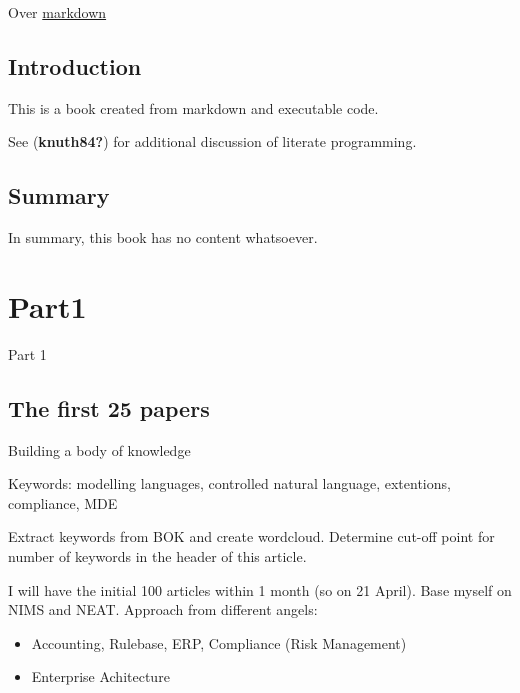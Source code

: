 \documentclass[
  letterpaper,
  DIV=11,
  numbers=noendperiod]{scrreprt}
\providecommand{\tightlist}{%
  \setlength{\itemsep}{0pt}\setlength{\parskip}{0pt}}\usepackage{longtable,booktabs,array}
\begin{document}
Over \href{https://www.arthurperret.fr/}{markdown}


\hypertarget{introduction}{%
\chapter{Introduction}\label{introduction}}

This is a book created from markdown and executable code.

See (\textbf{knuth84?}) for additional discussion of literate
programming.


\hypertarget{summary}{%
\chapter{Summary}\label{summary}}

In summary, this book has no content whatsoever.

\part{Part1}

Part 1

\hypertarget{the-first-25-papers}{%
\chapter{The first 25 papers}\label{the-first-25-papers}}

Building a body of knowledge

\hfill\break

Keywords: modelling languages, controlled natural language, extentions,
compliance, MDE

Extract keywords from BOK and create wordcloud. Determine cut-off point
for number of keywords in the header of this article.

I will have the initial 100 articles within 1 month (so on 21 April).
Base myself on NIMS and NEAT. Approach from different angels:

\begin{itemize}
\tightlist
\item
  Accounting, Rulebase, ERP, Compliance (Risk Management)
\item
  Enterprise Achitecture
\end{itemize}

\newpage{}
\end{document}
